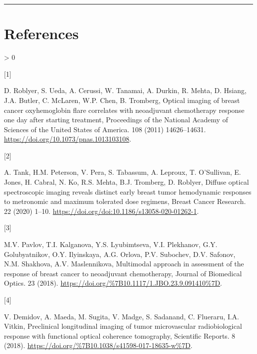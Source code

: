 \documentclass[
]{article}
\newlength{\cslhangindent}
\newlength{\csllabelwidth}
\newenvironment{CSLReferences}[2] %
 {%
  \setlength{\parindent}{0pt}
  \ifodd #1 \everypar{\setlength{\hangindent}{\cslhangindent}}\ignorespaces\fi
  \ifnum #2 > 0
  \setlength{\parskip}{#2\baselineskip}
  \fi
 }%
 {}
\newcommand{\CSLLeftMargin}[1]{\parbox[t]{\csllabelwidth}{#1}}
\newcommand{\CSLRightInline}[1]{\parbox[t]{\linewidth - \csllabelwidth}{#1}\break}
\begin{document}
\FloatBarrier

\begin{center}\rule{0.5\linewidth}{0.5pt}\end{center}

\newpage

\hypertarget{references}{%
\section{References}\label{references}}

\hypertarget{refs}{}
\begin{CSLReferences}{0}{0}
\leavevmode\hypertarget{ref-roblyer2011}{}%
\CSLLeftMargin{{[}1{]} }
\CSLRightInline{D. Roblyer, S. Ueda, A. Cerussi, W. Tanamai, A. Durkin, R. Mehta, D. Hsiang, J.A. Butler, C. McLaren, W.P. Chen, B. Tromberg, Optical imaging of breast cancer oxyhemoglobin flare correlates with neoadjuvant chemotherapy response one day after starting treatment, Proceedings of the National Academy of Sciences of the United States of America. 108 (2011) 14626--14631. \url{https://doi.org/10.1073/pnas.1013103108}.}

\leavevmode\hypertarget{ref-tank2020}{}%
\CSLLeftMargin{{[}2{]} }
\CSLRightInline{A. Tank, H.M. Peterson, V. Pera, S. Tabassum, A. Leproux, T. O'Sullivan, E. Jones, H. Cabral, N. Ko, R.S. Mehta, B.J. Tromberg, D. Roblyer, Diffuse optical spectroscopic imaging reveals distinct early breast tumor hemodynamic responses to metronomic and maximum tolerated dose regimens, Breast Cancer Research. 22 (2020) 1--10. \url{https://doi.org/doi:10.1186/s13058-020-01262-1}.}

\leavevmode\hypertarget{ref-pavlov2018}{}%
\CSLLeftMargin{{[}3{]} }
\CSLRightInline{M.V. Pavlov, T.I. Kalganova, Y.S. Lyubimtseva, V.I. Plekhanov, G.Y. Golubyatnikov, O.Y. Ilyinskaya, A.G. Orlova, P.V. Subochev, D.V. Safonov, N.M. Shakhova, A.V. Maslennikova, {Multimodal approach in assessment of the response of breast cancer to neoadjuvant chemotherapy}, {Journal of Biomedical Optics}. {23} (2018). \url{https://doi.org/\%7B10.1117/1.JBO.23.9.091410\%7D}.}

\leavevmode\hypertarget{ref-demidov2018}{}%
\CSLLeftMargin{{[}4{]} }
\CSLRightInline{V. Demidov, A. Maeda, M. Sugita, V. Madge, S. Sadanand, C. Flueraru, I.A. Vitkin, {Preclinical longitudinal imaging of tumor microvascular radiobiological response with functional optical coherence tomography}, {Scientific Reports}. {8} (2018). \url{https://doi.org/\%7B10.1038/s41598-017-18635-w\%7D}.}


\end{CSLReferences}
\end{document}
